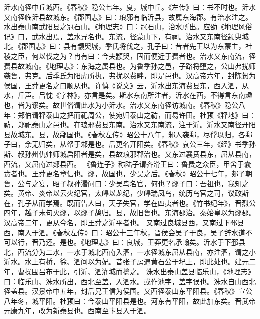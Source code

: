 \documentclass[12pt,UTF8]{ctexbook}
\begin{document}
沂水南径中丘城西。《春秋》隐公七年。夏，城中丘。《左传》曰：书不时也。沂水又南径临沂县故城东。《郡国志》曰：琅邪有临沂县，故属东海郡。有治水注之。水出泰山南武阳县之冠石山。《地理志》曰：冠石山，治水所出。应劭《地理风俗记》曰，武水出焉，盖水异名也。东流，径蒙山下，有祠。治水又东南径颛臾城北。《郡国志》曰：县有颛臾城，季氏将伐之，孔子曰：昔者先王以为东蒙主，社稷之臣，何以伐之为？冉有曰：今夫颛臾，固而便近于费者也。治水又东南流，径费县故城南。《地理志》：东海之属县也。为鲁季孙之邑，子路将堕之，公山弗扰师袭鲁，弗克。后季氏为阳虎所执，弗扰以费畔，即是邑也。汉高帝六年，封陈贺为侯国，王莽更名之曰顺从也。许慎《说文》云，沂水出东海费县东，西入泗，从水，斤声。吕忱《字林》，亦言是矣。斯水东南所注者，沂水在西，不得言东南趣也，皆为谬矣。故世俗谓此水为小沂水。治水又东南径访城南。《春秋》隐公八年：郑伯请释泰山之把而祀周公，使宛归泰山之祊，而易许田。杜预《释地》曰：祊，郑祀泰山之邑也。在琅邪费县东南。治水又东南流，注于沂。沂水又南径开阳县故城东。县，故鄅国也。《春秋左传》昭公十八年，邾人袭鄅，尽俘以归，各鄅子曰，余无归矣，从帑于邾是也。后更名开阳矣。《春秋》哀公三年，《经》书季孙斯、叔孙州仇帅师城启阳者是矣，县故琅邪郡治也。又东过襄贲县东，屈从县南，西流，又屈南过郯县西。
《鲁连子》称陆子谓齐滑王曰：鲁费之众臣，甲舍于囊贲者也。王莽更名章信也。郯，故国也，少昊之后。《春秋》昭公十七年，郯子朝鲁，公与之宴，昭子叔孙湣问曰：少吴鸟名官，何也？郯子曰：吾祖也，我知之矣。黄帝、炎帝以云火纪官，太皞以龙纪，少皞瑞凤鸟，统历鸟官之司，议政斯在，孔子从而学焉。既而告人曰，天子失官，学在四夷者也。《竹书纪年》，晋烈公四年，越子末句灭郯，以郯子鸪归。县，故旧鲁也。东海郡治。秦始皇以为郯郡。汉高帝二年，更从今名，即王莽之沂平者也。
又南过良城县西，又南过下邳县西，南入于泗。《春秋左传》曰：昭公十三年秋，晋侯会吴子于良，吴子辞水道不可以行，晋乃还。是也。《地理志》曰：良城，王莽更名承翰矣。沂水于下邳县北，西流分为二水，一水于城北西南入泗，一水径城东屈从县南，亦注泗，谓之小沂水。水上有桥，徐、泗间以为妃。昔张子房遇黄石公于圮上，即此处也。建元二年，曹操围吕布于此，引沂、泗灌城而擒之。
洙水出泰山盖县临乐山，《地理志》曰：临乐山、洙水所出，西北至盖，入泗水。或作池字，盖字误也。洙水自山西北径盖县。汉景帝中五年，封后兄王信为侯国。又西径泰山东平阳县。《春秋》宣公八年冬，城平阳。杜预曰：今泰山平阳县是也。河东有平阳，故此加东矣。晋武帝元康九年，改为新泰县也。西南至卞县入于泗。
\end{document}
